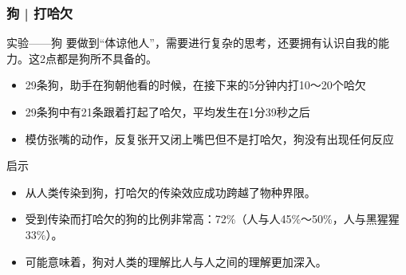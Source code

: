 \begin{frame}
  \frametitle{狗 | 打哈欠}
  \begin{block}{实验——狗}
    要做到“体谅他人”，需要进行复杂的思考，还要拥有认识自我的能力。这2点都是狗所不具备的。
    \begin{itemize}
      \item 29条狗，助手在狗朝他看的时候，在接下来的5分钟内打10～20个哈欠
      \item 29条狗中有21条跟着打起了哈欠，平均发生在1分39秒之后
      \item 模仿张嘴的动作，反复张开又闭上嘴巴但不是打哈欠，狗没有出现任何反应
    \end{itemize}
  \end{block}
  \pause
  \begin{block}{启示}
    \begin{itemize}
      \item 从人类传染到狗，打哈欠的传染效应成功跨越了物种界限。
      \item 受到传染而打哈欠的狗的比例非常高：72\%（人与人45\%～50\%，人与黑猩猩33\%）。
      \item 可能意味着，狗对人类的理解比人与人之间的理解更加深入。
    \end{itemize}
  \end{block}
\end{frame}

